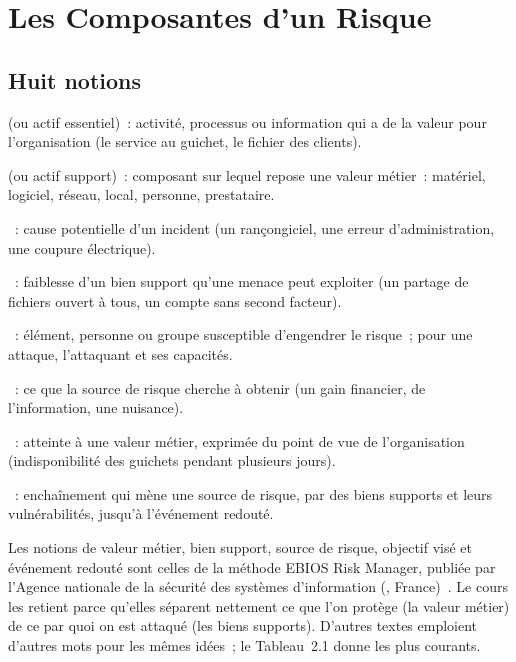 \section{Les Composantes d'un Risque}
\label{sec:c02-composantes}

\subsection{Huit notions}

\begin{boxdef}
 (ou actif essentiel)~:
activité, processus ou information qui a de la valeur pour l'organisation
(le service au guichet, le fichier des clients).

\medskip
{} (ou actif support)~:
composant sur lequel repose une valeur métier~: matériel, logiciel,
réseau, local, personne, prestataire.

\medskip
{}~: cause potentielle d'un incident (un
rançongiciel, une erreur d'administration, une coupure électrique).

\medskip
{}~: faiblesse d'un bien
support qu'une menace peut exploiter (un partage de fichiers ouvert à
tous, un compte sans second facteur).

\medskip
{}~: élément, personne ou
groupe susceptible d'engendrer le risque~; pour une attaque, l'attaquant
et ses capacités.

\medskip
{}~: ce que la source de
risque cherche à obtenir (un gain financier, de l'information, une
nuisance).

\medskip
{}~: atteinte à une
valeur métier, exprimée du point de vue de l'organisation (indisponibilité
des guichets pendant plusieurs jours).

\medskip
{}~: enchaînement qui mène
une source de risque, par des biens supports et leurs vulnérabilités,
jusqu'à l'événement redouté.
\end{boxdef}

Les notions de valeur métier, bien support, source de risque, objectif
visé et événement redouté sont celles de la méthode EBIOS Risk Manager,
publiée par l'Agence nationale de la sécurité des systèmes d'information
(, France)~\cite{anssi2018ebios}. Le cours les retient parce
qu'elles séparent nettement ce que l'on protège (la valeur métier) de ce
par quoi on est attaqué (les biens supports). D'autres textes emploient
d'autres mots pour les mêmes idées~; le Tableau~2.1 donne les plus
courants.

